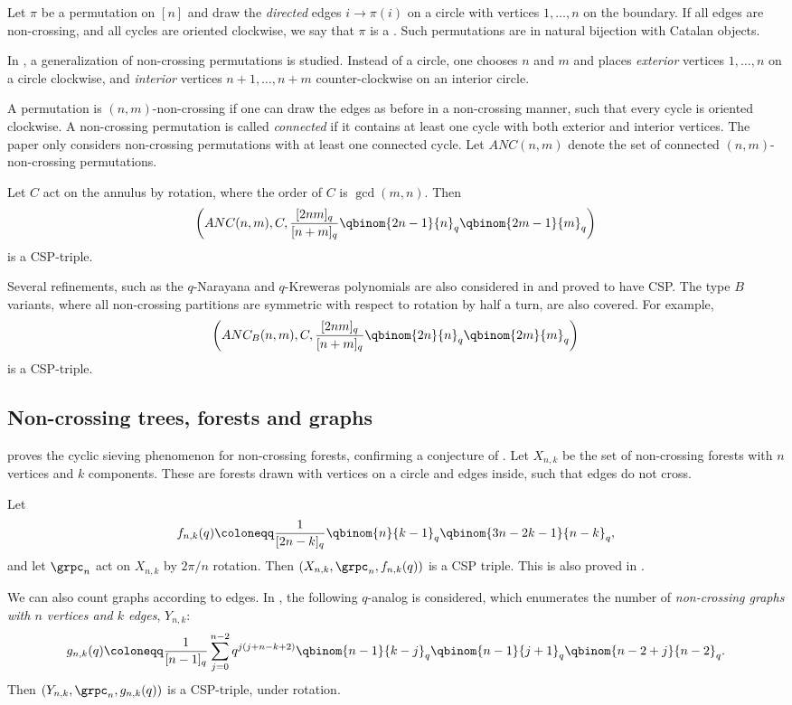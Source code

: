 Let $\pi$ be a permutation on $[n]$ and draw the \emph{directed} edges $i\to \pi(i)$ on a circle
with vertices $1,\dotsc,n$ on the boundary. If all edges are non-crossing,
and all cycles are oriented clockwise, we say that $\pi$ is a .
Such permutations are in natural bijection with Catalan objects.

In \cite{Kim2013}, a generalization of non-crossing permutations is studied.
Instead of a circle, one chooses $n$ and $m$ and places \emph{exterior} vertices $1,\dotsc,n$ on a circle
clockwise, and \emph{interior} vertices $n+1,\dotsc,n+m$ counter-clockwise on an interior circle.

A permutation is $(n,m)$-non-crossing if one can draw the edges as before in a non-crossing manner,
such that every cycle is oriented clockwise. A non-crossing permutation is called \emph{connected}
if it contains at least one cycle with both exterior and interior vertices.
The paper \cite{Kim2013} only considers non-crossing permutations with at least one connected cycle.
Let $ANC(n,m)$ denote the set of connected $(n,m)$-non-crossing permutations.

Let $C$ act on the annulus by rotation, where the order of $C$ is $\gcd(m,n)$.
Then
\[
\left( ANC(n,m), C, \frac{[2nm]_q}{[n+m]_q}\qbinom{2n-1}{n}_q\qbinom{2m-1}{m}_q \right)
\]
is a CSP-triple.

Several refinements, such as the $q$-Narayana and $q$-Kreweras polynomials are also considered
in \cite{Kim2013} and proved to have CSP.
The type $B$ variants, where all non-crossing partitions are symmetric with respect to rotation by half a turn,
are also covered.
For example,
\[
\left( ANC_B(n,m), C, \frac{[2nm]_q}{[n+m]_q}\qbinom{2n}{n}_q\qbinom{2m}{m}_q \right)
\]
is a CSP-triple.

\subsection[cspNonCrossingForests]{Non-crossing trees, forests and graphs}

 proves the cyclic sieving phenomenon for non-crossing
forests, confirming a conjecture of  \cite{Kluge2012}.
Let $X_{n,k}$ be the set of non-crossing forests with $n$ vertices and $k$ components.
These are forests drawn with vertices on a circle and edges inside, such that edges do not cross.

Let
\[
f_{n,k}(q) \coloneqq \frac{1}{[2n-k]_q} \qbinom{n}{k-1}_q \qbinom{3n-2k-1}{n-k}_q,
\]
and let $\grpc_n$ act on $X_{n,k}$ by $2\pi/n$ rotation. Then $(X_{n,k},\grpc_n,f_{n,k}(q))$
is a CSP triple. This is also proved in \cite{Poznanovic2011}.


We can also count graphs according to edges. In \cite{Poznanovic2011},
the following $q$-analog is considered, which enumerates the number of
\emph{non-crossing graphs with $n$ vertices and $k$ edges}, $Y_{n,k}$:
\[
g_{n,k}(q) \coloneqq \frac{1}{[n-1]_q} \sum_{j=0}^{n-2}
q^{j(j+n-k+2)}\qbinom{n-1}{k-j}_q  \qbinom{n-1}{j+1}_q \qbinom{n-2+j}{n-2}_q.
\]
Then $(Y_{n,k},\grpc_n,g_{n,k}(q))$ is a CSP-triple, under rotation.
